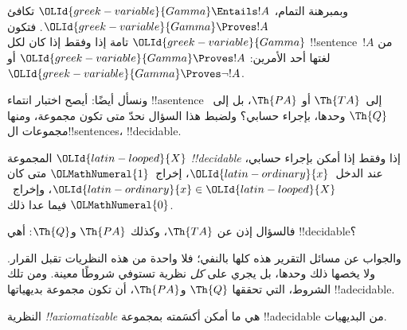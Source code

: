 \documentclass[../../../include/open-logic-section]{subfiles}
\begin{document}
\begin{explain}
وبمبرهنة التمام، $\OLId{greek-variable}{Gamma}\Entails !A$ تكافئ
$\OLId{greek-variable}{Gamma}\Proves !A$. فتكون $\OLId{greek-variable}{Gamma}$ تامة إذا وفقط إذا
كان لكل !!{sentence}~$!A$ من لغتها أحد الأمرين:
$\OLId{greek-variable}{Gamma}\Proves !A$ أو $\OLId{greek-variable}{Gamma}\Proves\lnot !A$.
\end{explain}

ونسأل أيضًا: أيصح اختبار انتماء !!a{sentence}
إلى~$\Th{TA}$ أو $\Th{PA}$، بل إلى~$\Th{Q}$ وحدها،
بإجراء حسابي؟ ولضبط هذا السؤال نحدّ متى تكون مجموعة،
ومنها مجموعات ال!!{sentence}s، !!{decidable}.

\begin{defn}
المجموعة $\OLId{latin-looped}{X}$ \emph{!!{decidable}} إذا وفقط إذا أمكن
بإجراء حسابي، عند الدخل~$\OLId{latin-ordinary}{x}$، إخراج~$\OLMathNumeral{1}$ متى كان
$\OLId{latin-ordinary}{x}\in \OLId{latin-looped}{X}$، وإخراج~$\OLMathNumeral{0}$ فيما عدا ذلك.
\end{defn}

فالسؤال إذن عن $\Th{TA}$، وكذلك $\Th{PA}$ و$\Th{Q}$:
أهي !!{decidable}؟

والجواب عن مسائل التقرير هذه كلها بالنفي؛ فلا واحدة
من هذه النظريات تقبل القرار. ولا يخصها ذلك وحدها،
بل يجري على \emph{كل} نظرية تستوفي شروطًا معينة.
ومن تلك الشروط، التي تحققها $\Th{Q}$ و$\Th{PA}$،
أن تكون مجموعة بديهياتها !!a{decidable}.

\begin{defn}
النظرية \emph{!!{axiomatizable}} هي ما أمكن أكسَمته بمجموعة
!!a{decidable} من البديهيات.
\end{defn}
\end{document}
